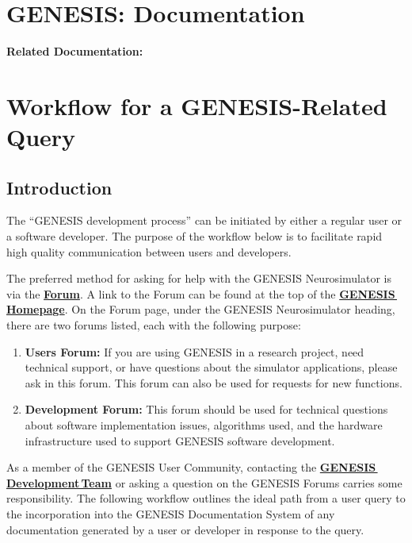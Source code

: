\documentclass[12pt]{article}
\begin{document}
\section*{GENESIS: Documentation}

{\bf Related Documentation:}

\section*{Workflow for a GENESIS-Related Query}

\subsection*{Introduction}

The ``GENESIS development process'' can be initiated by either a
regular user or a software developer. The purpose of the workflow
below is to facilitate rapid high quality communication between users
and developers.

The preferred method for asking for help with the GENESIS
Neurosimulator is via the
\href{http://www.genesis-sim.org/forum}{\bf Forum}.  A link to the Forum
can be found at the top of the
\href{http://www.genesis-sim.org/}{\bf GENESIS\,Homepage}.  On the Forum
page, under the GENESIS Neurosimulator heading, there are two forums
listed, each with the following purpose:

\begin{enumerate}
\item {\bf Users Forum:} If you are using GENESIS in a research
  project, need technical support, or have questions about the
  simulator applications, please ask in this forum.  This forum can
  also be used for requests for new functions.
\item {\bf Development Forum:} This forum should be used for technical
  questions about software implementation issues, algorithms used, and
  the hardware infrastructure used to support GENESIS software
  development.
\end{enumerate}

As a member of the GENESIS User Community, contacting the
\href{http://www.genesis-sim.org/contact}{\bf GENESIS\,Development\,Team} or
asking a question on the GENESIS Forums carries some responsibility. The
following workflow outlines the ideal path from a user query to the
incorporation into the GENESIS Documentation System of any
documentation generated by a user or developer in response to the query.
\end{document}
